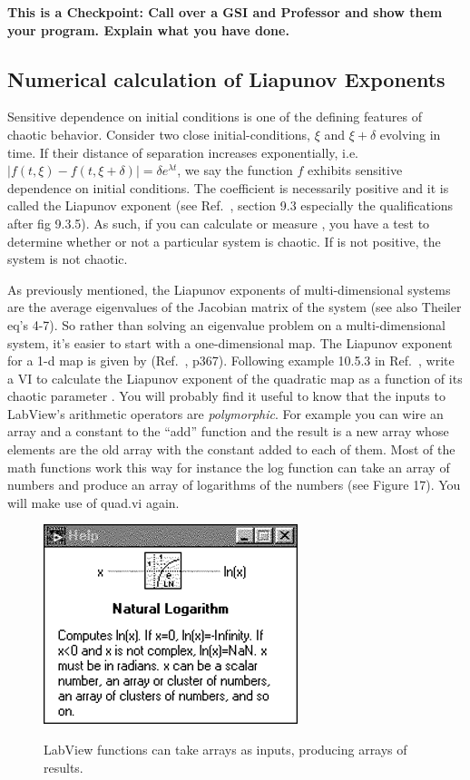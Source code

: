 \documentclass{../lab}
\begin{document}
\textbf{This is a Checkpoint: Call over a GSI and Professor and show them your program. Explain what you have done.}

\subsection{Numerical calculation of Liapunov Exponents}

Sensitive dependence on initial conditions is one of the defining features of chaotic behavior. Consider two close initial-conditions, $\xi$ and $\xi + \delta$ evolving in time. If their distance of separation increases exponentially, i.e. $|f(t,\xi) - f(t,\xi + \delta)| = \delta e^{\lambda t} $, we say the function $f$ exhibits sensitive dependence on initial conditions. The coefficient is necessarily positive and it is called the Liapunov exponent (see Ref.~\cite{Strogatz}, section 9.3 especially the qualifications after fig 9.3.5). As such, if you can calculate or measure , you have a test to determine whether or not a particular system is chaotic. If is not positive, the system is not chaotic.

As previously mentioned, the Liapunov exponents of multi-dimensional systems are the average eigenvalues of the Jacobian matrix of the system (see also Theiler \cite{Theiler} eq's 4-7). So rather than solving an eigenvalue problem on a multi-dimensional system, it's easier to start with a one-dimensional map. The Liapunov exponent for a 1-d map is given by (Ref.~\cite{Strogatz}, p367). Following example 10.5.3 in Ref.~\cite{Strogatz}, write a VI to calculate the Liapunov exponent of the quadratic map as a function of its chaotic parameter . You will probably find it useful to know that the inputs to LabView's arithmetic operators are \emph{polymorphic}. For example you can wire an array and a constant to the ``add'' function and the result is a new array whose elements are the old array with the constant added to each of them. Most of the math functions work this way for instance the log function can take an array of numbers and produce an array of logarithms of the numbers (see Figure 17). You will make use of quad.vi again.

\begin{figure}[h]
    \centering
    \href{http://experimentationlab.berkeley.edu/sites/default/files/images/Nldimage106.gif}{\includegraphics[width=0.5\linewidth]{images/Nldimage106.png}}
    \caption{LabView functions can take arrays as inputs, producing arrays of results.}
    \label{fig:Nldimage106}
\end{figure}
\end{document}
